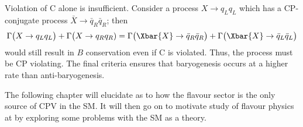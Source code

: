 Violation of C alone is insufficient.
Consider a process $X\to q_Lq_L$ which has a CP-conjugate process $\bar X\to \bar q_R\bar q_R$;
then
\begin{equation}
  \Gamma\big(X\to q_Lq_L\big) + \Gamma\big(X\to q_Rq_R)
  =
  \Gamma\big(\Xbar{X}\to \bar q_R\bar q_R\big) + \Gamma\big(\Xbar{X}\to \bar q_L\bar q_L\big)
\end{equation}
would still result in $B$ conservation even if C is violated.
Thus, the process must be CP violating.
The final criteria ensures that baryogenesis occurs at a higher rate than anti-baryogenesis.

The following chapter will elucidate as to how the flavour sector is the only source of CPV in the
SM.
It will then go on to motivate study of flavour physics at \lhcb by exploring some problems with
the SM as a theory.






